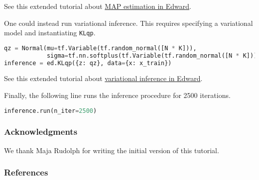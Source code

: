 See this extended tutorial about
\href{/tutorials/map}{MAP estimation in Edward}.

One could instead run variational inference. This requires specifying
a variational model and instantiating \texttt{KLqp}.
\begin{lstlisting}[language=Python]
qz = Normal(mu=tf.Variable(tf.random_normal([N * K])),
            sigma=tf.nn.softplus(tf.Variable(tf.random_normal([N * K]))))
inference = ed.KLqp({z: qz}, data={x: x_train})
\end{lstlisting}
See this extended tutorial about
\href{/tutorials/variational-inference}{variational inference in Edward}.

Finally, the following line runs the inference procedure for 2500
iterations.
\begin{lstlisting}[language=Python]
inference.run(n_iter=2500)
\end{lstlisting}

\subsubsection{Acknowledgments}

We thank Maja Rudolph for writing the initial version of this
tutorial.

\subsubsection{References}
